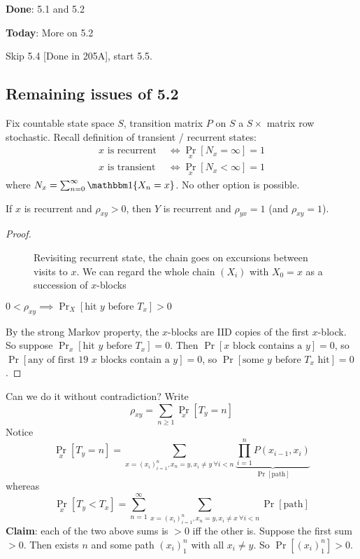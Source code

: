 
\textbf{Done}: 5.1 and 5.2

\textbf{Today}: More on 5.2

Skip 5.4 [Done in 205A], start 5.5.

\subsection{Remaining issues of 5.2}

Fix countable state space $S$, transition matrix $P$ on $S$ a $S \times $ matrix
row stochastic. Recall definition of transient / recurrent states:
\begin{align*}
  \text{$x$ is recurrent } &\iff \Pr_x[N_x = \infty] = 1 \\
  \text{$x$ is transient} &\iff \Pr_x[N_x < \infty] = 1
\end{align*}
where $N_x = \sum_{n=0}^\infty \ind\{X_n = x\}$.
No other option is possible.

\begin{theorem}[Theorem 5.3.2]
  If $x$ is recurrent and $\rho_{xy} > 0$, then $Y$
  is recurrent and $\rho_{yx} = 1$ (and $\rho_{xy} = 1$).
\end{theorem}

\begin{proof}
  \begin{figure}[H]
    \centering
    \caption{Revisiting recurrent state, the chain goes on excursions
      between visits to $x$. We can regard the whole chain $(X_i)$ with $X_0 = x$
      as a succession of $x$-blocks
    }
    \label{fig:revisiting-recurrent-state}
  \end{figure}

  $0 < \rho_{xy} \implies \Pr_X[\text{hit $y$ before $T_x$}] > 0$

  By the strong Markov property, the $x$-blocks
  are IID copies of the first $x$-block.
  So suppose $\Pr_x[\text{hit $y$ before $T_x$}] = 0$.
  Then $\Pr[\text{$x$ block contains a $y$}] = 0$,
  so $\Pr[\text{any of first 19 $x$ blocks contain a $y$}] = 0$,
  so $\Pr[\text{some $y$ before $T_x$ hit}] = 0$.
\end{proof}

Can we do it without contradiction? Write
\[
  \rho_{xy} = \sum_{n \geq 1} \Pr_x[T_y = n]
\]
Notice
\[
  \Pr_x[T_y = n] = \sum_{x = (x_i)_{i=1}^n, x_n = y, x_i \neq y~\forall i < n}
  \underbrace{\prod_{i=1}^n P(x_{i-1}, x_i)}_{\Pr[\text{path}]}
\]
whereas
\[
  \Pr_x[T_y < T_x] = \sum_{n=1}^\infty \sum_{x = (x_i)_{i=1}^n, x_n = y, x_i \neq x~\forall i < n} \Pr[\text{path}]
\]
\textbf{Claim}: each of the two above sums is $> 0$ iff the other is.
Suppose the first sum $> 0$.
Then exists $n$ and some path $(x_i)_1^n$ with all $x_i \neq y$.
So $\Pr[(x_i)_1^n] > 0$.

